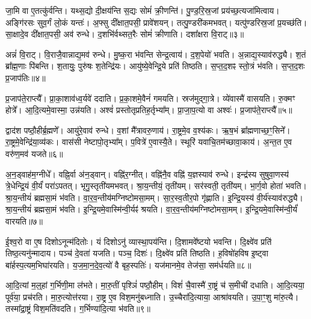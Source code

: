 जा॒मि वा ए॒तत्कु॑र्वन्ति।
यथ्स॒द्यो दी॒क्षय॑न्ति स॒द्यः सोमं॑ क्री॒णन्ति॑।
पु॒ण्ड॒रि॒स्र॒जां प्रय॑च्छ॒त्यजा॑मित्वाय।
अङ्गि॑रसः सुव॒र्गं लो॒कं यन्तः॑।
अ॒फ्सु दी᳚क्षात॒पसी॒ प्रावे॑शयन्।
तत्पु॒ण्डरी॑कमभवत्।
यत्पु॑ण्डरिस्र॒जां प्र॒यच्छ॑ति।
सा॒क्षादे॒व दी᳚क्षात॒पसी॒ अव॑ रुन्धे।
द॒शभि॑र्वथ्सत॒रैः सोमं॑ क्रीणाति।
दशा᳚क्षरा वि॒राट्॥३॥\ip

अन्नं॑ वि॒राट्।
वि॒राजै॒वान्नाद्य॒मव॑ रुन्धे।
मु॒ष्क॒रा भ॑वन्ति सेन्द्र॒त्वाय॑।
द॒श॒पेयो॑ भवति।
अ॒न्नाद्य॒स्या\-व॑\-रुद्ध्यै।
श॒तं ब्रा᳚ह्म॒णाः पि॑बन्ति।
श॒तायुः॒ पुरु॑षः श॒तेन्द्रि॑यः।
आयु॑ष्ये॒वेन्द्रि॒ये प्रति॑ तिष्ठति।
स॒प्त॒द॒शꣴ स्तो॒त्रं भ॑वति।
स॒प्त॒द॒शः प्र॒जा\-प॑तिः॥४॥\ip

प्र॒जा\-प॑ते॒राप्त्यै᳚।
प्रा॒का॒शाव॑ध्व॒र्यवे॑ ददाति।
प्र॒का॒शमे॒वैनं॑ गमयति।
स्रज॑मुद्गा॒त्रे।
व्ये॑वास्मै॑ वासयति।
रु॒क्मꣳ होत्रे᳚।
आ॒दि॒त्यमे॒वास्मा॒ उन्न॑यति।
अश्वं॑ प्रस्तोतृप्रतिह॒र्तृभ्या᳚म्।
प्रा॒जा॒प॒त्यो वा अश्वः॑।
प्र॒जा\-प॑ते॒राप्त्यै᳚॥५॥\ip

द्वाद॑श पष्ठौ॒हीर्ब्र॒ह्मणे᳚।
आयु॑रे॒वाव॑ रुन्धे।
व॒शां मै᳚त्रावरु॒णाय॑।
रा॒ष्ट्रमे॒व व॒श्य॑कः।
ऋ॒ष॒भं ब्रा᳚ह्मणाच्छ॒ꣳ॒सिने᳚।
रा॒ष्ट्रमे॒वेन्द्रि॑या॒\-व्य॑कः।
वास॑सी नेष्टापो॒तृभ्या᳚म्।
प॒वित्रे॑ ए॒वास्यै॒ते।
स्थूरि॑ यवाचि॒तम॑च्छावा॒काय॑।
अ॒न्त॒त ए॒व वरु॑ण॒मव॑ यजते॥६॥\ip

अ॒न॒ड्वाह॑म॒ग्नीधे᳚।
वह्नि॒र्वा अ॑न॒ड्वान्।
वह्नि॑र॒ग्नीत्।
वह्नि॑नै॒व वह्नि॑ य॒ज्ञस्याव॑ रुन्धे।
इन्द्र॑स्य सुषुवा॒णस्य॑ त्रे॒धेन्द्रि॒यं वी॒र्यं॑ परा॑\-ऽपतत्।
भृगु॒स्तृती॑यमभवत्।
श्रा॒य॒न्तीयं॒ तृती॑यम्।
सर॑स्वती॒ तृती॑यम्।
भा॒र्ग॒वो होता॑ भवति।
श्रा॒य॒न्तीयं॑ ब्रह्मसा॒मं भ॑वति।
वा॒र॒व॒न्तीय॑\-मग्नि\-ष्टोम\-सा॒मम्।
सा॒र॒स्व॒तीर॒पो गृ॑ह्णाति।
इ॒न्द्रि॒यस्य॑ वी॒र्य॑स्या\-व॑\-रुद्ध्यै।
श्रा॒य॒न्तीयं॑ ब्रह्मसा॒मं भ॑वति।
इ॒न्द्रि॒यमे॒वास्मि॑न्वी॒र्यꣴ॑ श्रयति।
वा॒र॒व॒न्तीय॑मग्निष्टोमसा॒मम्।
इ॒न्द्रि॒यमे॒वास्मि॑न्वी॒र्यं॑ वारयति॥७॥\ip\anuvakamend[वि॒राट्प्र॒जा\-प॑ति॒रश्वः॑ प्र॒जा\-प॑ते॒राप्त्यै॑ यजते ब्रह्मसा॒मं भ॑वति स॒प्त च॑]

ई॒श्व॒रो वा ए॒ष दिशो\-ऽनून्म॑दितोः।
यं दिशोऽनु॑ व्यास्था॒पय॑न्ति।
दि॒शामवे᳚ष्टयो भवन्ति।
दि॒क्ष्वे॑व प्रति॑ तिष्ठ॒त्यनु॑न्मादाय।
पञ्च॑ दे॒वता॑ यजति।
पञ्च॒ दिशः॑।
दि॒क्ष्वे॑व प्रति॑ तिष्ठति।
ह॒विषो॑हविष इ॒ष्ट्वा बा॑र्\mbox{}हस्प॒त्यम॒भिघा॑रयति।
य॒ज॒मा॒न॒दे॒व॒त्यो॑ वै बृह॒स्पतिः॑।
यज॑मानमे॒व तेज॑सा॒ सम॑र्धयति॥८॥\ip

आ॒दि॒त्यां म॒ल्॒हां ग॒र्भिणी॒मा ल॑भते।
मा॒रु॒तीं पृश्ञिं॑ पष्ठौ॒हीम्।
विशं॑ चै॒वास्मै॑ रा॒ष्ट्रं च॑ स॒मीची॑ दधाति।
आ॒दि॒त्यया॒ पूर्व॑या॒ प्रच॑रति।
मा॒रु॒त्योत्त॑रया।
रा॒ष्ट्र ए॒व विश॒मनु॑बध्नाति।
उ॒च्चैरा॑दि॒त्याया॒ आश्रा॑वयति।
उ॒पा॒ꣳ॒शु मा॑रु॒त्यै।
तस्मा᳚द्रा॒ष्ट्रं विश॒मति॑वदति।
ग॒र्भिण्या॑दि॒त्या भ॑वति॥९॥\ip

